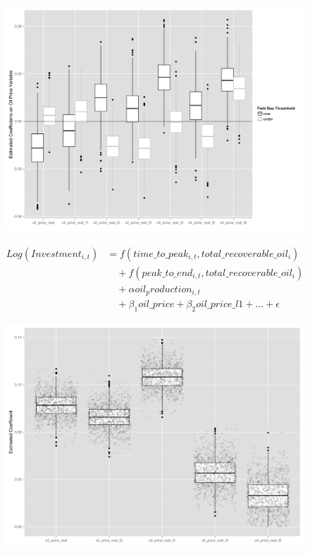 \documentclass{beamer}
\begin{document}
\begin{frame}[plain]
	\begin{figure}
		\includegraphics[width=.8\textwidth]{gam_price_dirty_box.png}
		\caption{}
		\label{gam_price_dirty_box}
	\end{figure}
\end{frame}


\begin{frame}[plain]
	\begin{equation}
	\begin{split}
		Log(Investment_{i,t})&=f(time\_to\_peak_{i,t}, total\_recoverable\_oil_i) \\
		& \quad + f(peak\_to\_end_{i,t}, total\_recoverable\_oil_i) \\
		& \quad + \alpha oil_production_{i,t} \\
		& \quad + \beta_1 oil\_price + \beta_2 oil\_price\_l1 + ... +  \epsilon
	\end{split}
	\label{gam_invest_eqn}
	\end{equation}
\end{frame}


\begin{frame}[plain]
	\begin{figure}
		\includegraphics[width=.8\textwidth]{gam_price_invest_box.png}
		\caption{}
		\label{gam_price_invest_box}
	\end{figure}
\end{frame}
\end{document}
